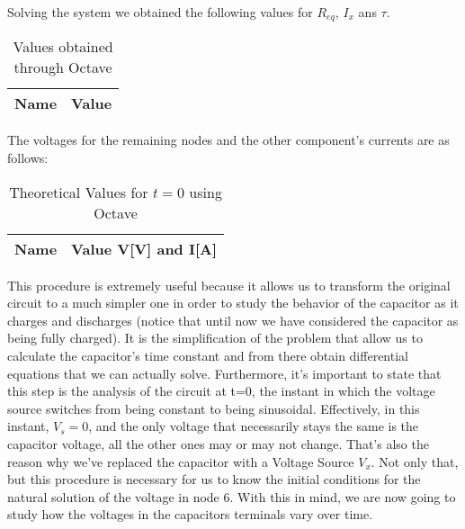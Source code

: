 Solving the system we obtained the following values for $R_{eq}$, $I_x$ ans $\tau$.

\begin{table}[H]
  \centering
  \begin{tabular}{|l|r|}
    \hline
    {\bf Name} & {\bf Value} \\ \hline
    
  \end{tabular}
  \caption{Values obtained through Octave}
  \label{tab:R_eq}
\end{table}

The voltages for the remaining nodes and the other component's currents are as follows:

\begin{table}[H]
  \centering
  \begin{tabular}{|l|r|}
    \hline
    {\bf Name} & {\bf Value V[V] and I[A]} \\ \hline
    
  \end{tabular}
  \caption{Theoretical Values for $t=0$ using Octave}
  \label{tab:alinea2_voltagens_tab}
\end{table}

This procedure is extremely useful because it allows us to transform the original circuit to a much simpler one in order to study the behavior of the capacitor as it charges and discharges (notice that until now we have considered the capacitor as being fully charged). It is the simplification of the problem that allow us to calculate the capacitor's time constant and from there obtain differential equations that we can actually solve.
Furthermore, it's important to state that this step is the analysis of the circuit at t=0, the instant in which the voltage source switches from being constant to being sinusoidal. Effectively, in this instant, $V_{s}=0$, and the only voltage that necessarily stays the same is the capacitor voltage, all the other ones may or may not change. That's also the reason why we've replaced the capacitor with a Voltage Source $V_{x}$. Not only that, but
this procedure is necessary for us to know the initial conditions for the natural solution of the voltage in node 6.
With this in mind, we are now going to study how the voltages in the capacitors terminals vary over time.


